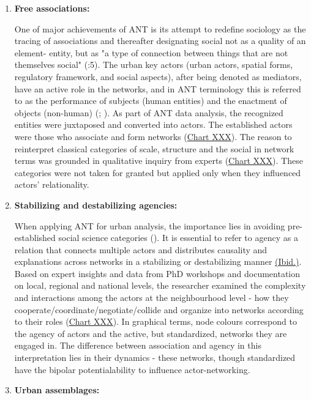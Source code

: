 \documentclass[11pt]{report}
\begin{document}
\begin{enumerate}
\item \textbf{Free associations:}

One of major achievements of ANT is its attempt to redefine sociology as the tracing of associations and thereafter designating social not as a quality of an element- entity, but as "a type of connection between things that are not themselves social"  (\href{Latour}{\citealt{latour_science_2005}}:5).
The urban key actors (urban actors, spatial forms, regulatory framework, and social aspects), after being denoted as mediators, have an active role in the networks, and in ANT terminology this is referred to as the performance of subjects (human entities) and the enactment of objects (non-human) (\href{Callon}{\citealt{callon_elements_1986}}; \href{Farias}{\citealt{farias_introduction:_2011}}). As part of ANT data analysis, the recognized entities were juxtaposed and converted into actors.  The established actors were those who associate and form networks (\href{Table ANT discource analysos}{Chart XXX}). The reason to reinterpret classical categories of scale, structure and the social in network terms was grounded in qualitative inquiry from experts (\href{Table data sources}{Chart XXX}). These categories were not taken for granted but applied only when they influenced actors’ relationality.

\item \textbf{Stabilizing and destabilizing agencies:}

When applying ANT for urban analysis, the importance lies in avoiding pre-established social science categories (\href{Farias}{\citealt{farias_introduction:_2011}}). It is essential to refer to agency as a relation that connects multiple actors and distributes causality and explanations across networks in a stabilizing or destabilizing manner  \href{ref}{(Ibid.)}. 
Based on expert insights and data from PhD workshops and documentation on local, regional and national levels, the researcher examined the complexity and interactions among the actors at the neighbourhood level - how they cooperate/coordinate/negotiate/collide and organize into networks according to their roles (\href{Table ANT discource analysos}{Chart XXX}). In graphical terms, node colours correspond to the agency of actors and the active, but standardized, networks they are engaged in. The difference between association and agency in this interpretation lies in their dynamics - these networks, though standardized have the bipolar potentialability to influence actor-networking.

\item \textbf{Urban assemblages:}


\end{enumerate}
\end{document}
